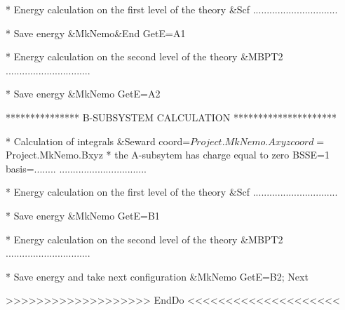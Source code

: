 \begin{sourcelisting}
  * Energy calculation on the first level of the theory
  &Scf
     ...............................

  * Save energy
  &MkNemo&End
    GetE=A1

  * Energy calculation on the second level of the theory
  &MBPT2
     ...............................

  * Save energy
  &MkNemo
    GetE=A2

  *************** B-SUBSYSTEM CALCULATION *********************

  * Calculation of integrals
  &Seward
    coord=$Project.MkNemo.Axyz
    coord=$Project.MkNemo.Bxyz
    * the A-subsytem has charge equal to zero
    BSSE=1
    basis=........
     ................................

  * Energy calculation on the first level of the theory
  &Scf
     ...............................

  * Save energy
  &MkNemo
    GetE=B1

  * Energy calculation on the second level of the theory
  &MBPT2
     ...............................

  * Save energy and take next configuration
  &MkNemo
    GetE=B2; Next

>>>>>>>>>>>>>>>>>>> EndDo <<<<<<<<<<<<<<<<<<<<
\end{sourcelisting}


